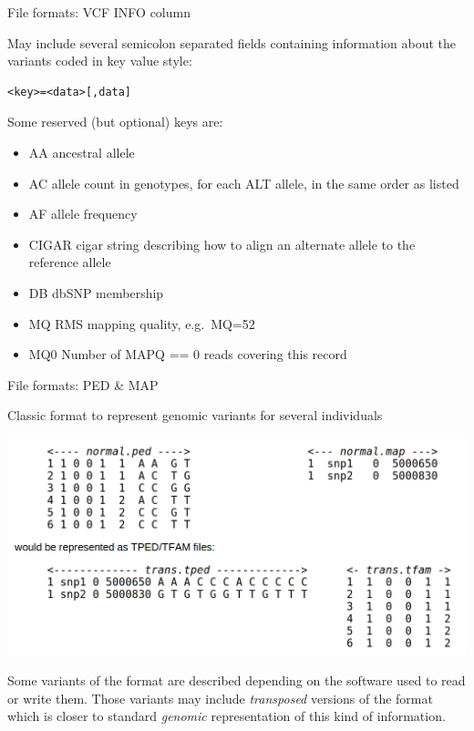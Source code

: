 \begin{frame}[fragile]{File formats: VCF INFO column}

May include several semicolon separated fields containing information
about the variants coded in key value style:

\begin{verbatim}
<key>=<data>[,data]
\end{verbatim}

Some reserved (but optional) keys are:

\begin{itemize}
\itemsep1pt\parskip0pt
\item
  AA ancestral allele
\item
  AC allele count in genotypes, for each ALT allele, in the same order
  as listed
\item
  AF allele frequency
\item
  CIGAR cigar string describing how to align an alternate allele to the
  reference allele
\item
  DB dbSNP membership
\item
  MQ RMS mapping quality, e.g.~MQ=52
\item
  MQ0 Number of MAPQ == 0 reads covering this record
\end{itemize}

\end{frame}

\begin{frame}{File formats: PED \& MAP}

Classic format to represent genomic variants for several individuals

\centerline{\includegraphics[scale=0.3]{images/ped-map.png}}

Some variants of the format are described depending on the software used
to read or write them. Those variants may include \emph{transposed}
versions of the format which is closer to standard \emph{genomic}
representation of this kind of information.

\end{frame}

